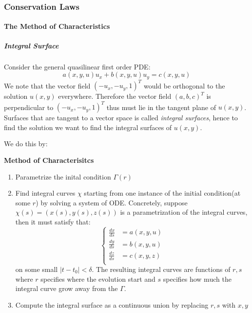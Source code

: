 \subsubsection{Conservation Laws}

%
\providecommand{\argmin}{\operatorname*{arg\,min}}%
\providecommand{\argmax}{\operatorname*{arg\,max}}%
\paragraph{The Method of Characteristics}

\subparagraph{Integral Surface}

Consider the general quasilinear first order PDE:
\begin{equation}
a(x,y,u)u_x + b(x,y,u)u_y = c(x,y,u)
\end{equation}
We note that the vector field $( -u_x, -u_y, 1)^T$ would be orthogonal to the solution $u(x,y)$ everywhere. Therefore the vector field $(a, b, c)^T$ is perpendicular to $( -u_x, -u_y, 1)^T$ thus must lie in the tangent plane of $u(x,y)$. Surfaces that are tangent to a vector space is called \textit{integral surfaces}, hence to find the solution we want to find the integral surfaces of $u(x,y)$.

We do this by:

\begin{framed}
\textbf{Method of Characterisitcs}\\
\begin{enumerate}
\item Parametrize the inital condition $\Gamma(r)$
\item Find integral curves $\chi$ starting from one instance of the initial condition(at some $r$) by solving a system of ODE.
Concretely, suppose $\chi(s) = (x(s),y(s),z(s))$ is a parametrization of the integral curves, then it must satisfy that:
\begin{equation}
\begin{cases}
\frac{dx}{ds}&=a(x,y,u) \\
\frac{dy}{ds}&=b(x,y,u) \\
\frac{dz}{ds}&=c(x,y,z) \\
\end{cases}
\end{equation}
on some small $|t -t_0|<\delta$.  The resulting integral curves are functions of $r,s$ where $r$ specifies where the evolution start and $s$ specifies how much the integral curve grow away from the $\Gamma$.


\item Compute the integral surface as a continuous union by replacing $r,s$ with $x,y$
\end{enumerate}
\end{framed}

